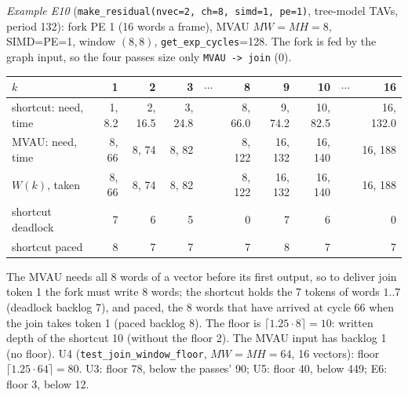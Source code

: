 \documentclass[10pt,a4paper]{article}
\newcommand{\code}[1]{\texttt{#1}}
\begin{document}
\emph{Example E10} (\code{make\_residual(nvec=2, ch=8, simd=1, pe=1)}, tree-model TAVs,
period 132): fork PE 1 (16 words a frame), MVAU $MW=MH=8$, SIMD=PE=1, window
$(8,8)$, \code{get\_exp\_cycles}=128. The fork is fed by the graph input, so the four passes
size only \code{MVAU -> join} (0).

\begin{center}\small
\begin{tabular}{@{}lrrrrrrrrr@{}}
\toprule
$k$ & 1&2&3&$\cdots$&8&9&10&$\cdots$&16\\
\midrule
shortcut: need, time & 1, 8.2 & 2, 16.5 & 3, 24.8 & & 8, 66.0 & 9, 74.2 & 10, 82.5 & & 16, 132.0\\
MVAU: need, time & 8, 66 & 8, 74 & 8, 82 & & 8, 122 & 16, 132 & 16, 140 & & 16, 188\\
$W(k)$, taken & 8, 66 & 8, 74 & 8, 82 & & 8, 122 & 16, 132 & 16, 140 & & 16, 188\\
shortcut deadlock & 7 & 6 & 5 & & 0 & 7 & 6 & & 0\\
shortcut paced & 8 & 7 & 7 & & 7 & 8 & 7 & & 7\\
\bottomrule
\end{tabular}
\end{center}

The MVAU needs all 8 words of a vector before its first output, so to deliver join token 1
the fork must write 8 words; the shortcut holds the 7 tokens of words $1..7$ (deadlock
backlog 7), and paced, the 8 words that have arrived at cycle 66 when the join takes
token 1 (paced backlog 8). The floor is $\lceil 1.25\cdot8\rceil=10$: written depth of
the shortcut 10 (without the floor 2). The MVAU input has backlog 1 (no floor).
U4 (\code{test\_join\_window\_floor}, $MW=MH=64$, 16 vectors): floor $\lceil1.25\cdot64\rceil=80$.
U3: floor 78, below the passes' 90; U5: floor 40, below 449; E6: floor 3, below 12.
\end{document}
